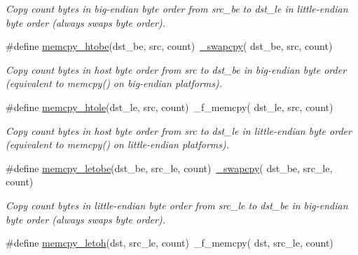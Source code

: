 \begin{DoxyCompactItemize}
\begin{DoxyCompactList}\small\item\em Copy {\itshape count} bytes in big-\/endian byte order from {\itshape src\-\_\-be} to {\itshape dst\-\_\-le} in little-\/endian byte order (always swaps byte order). \end{DoxyCompactList}\item 
\hypertarget{group__util__byteorder_gaf0f22982f04251ea70fba1fb30d55ef5}{\#define \hyperlink{group__util__byteorder_gaf0f22982f04251ea70fba1fb30d55ef5}{memcpy\-\_\-htobe}(dst\-\_\-be, src, count)~\hyperlink{group__util__byteorder_ga23fd4d4005a80a26ff3c6ba23a4af560}{\-\_\-swapcpy}( dst\-\_\-be, src, count)}\label{group__util__byteorder_gaf0f22982f04251ea70fba1fb30d55ef5}

\begin{DoxyCompactList}\small\item\em Copy {\itshape count} bytes in host byte order from {\itshape src} to {\itshape dst\-\_\-be} in big-\/endian byte order (equivalent to memcpy() on big-\/endian platforms). \end{DoxyCompactList}\item 
\hypertarget{group__util__byteorder_gaf677c5c03da581dab8015e8350750c00}{\#define \hyperlink{group__util__byteorder_gaf677c5c03da581dab8015e8350750c00}{memcpy\-\_\-htole}(dst\-\_\-le, src, count)~\-\_\-f\-\_\-memcpy( dst\-\_\-le, src, count)}\label{group__util__byteorder_gaf677c5c03da581dab8015e8350750c00}

\begin{DoxyCompactList}\small\item\em Copy {\itshape count} bytes in host byte order from {\itshape src} to {\itshape dst\-\_\-le} in little-\/endian byte order (equivalent to memcpy() on little-\/endian platforms). \end{DoxyCompactList}\item 
\hypertarget{group__util__byteorder_gac8afbbc0aa0b7d35ebf38f54dbfbe6c2}{\#define \hyperlink{group__util__byteorder_gac8afbbc0aa0b7d35ebf38f54dbfbe6c2}{memcpy\-\_\-letobe}(dst\-\_\-be, src\-\_\-le, count)~\hyperlink{group__util__byteorder_ga23fd4d4005a80a26ff3c6ba23a4af560}{\-\_\-swapcpy}( dst\-\_\-be, src\-\_\-le, count)}\label{group__util__byteorder_gac8afbbc0aa0b7d35ebf38f54dbfbe6c2}

\begin{DoxyCompactList}\small\item\em Copy {\itshape count} bytes in little-\/endian byte order from {\itshape src\-\_\-le} to {\itshape dst\-\_\-be} in big-\/endian byte order (always swaps byte order). \end{DoxyCompactList}\item 
\hypertarget{group__util__byteorder_ga9639d55fe8e5b4daf83a76de40aa3e4e}{\#define \hyperlink{group__util__byteorder_ga9639d55fe8e5b4daf83a76de40aa3e4e}{memcpy\-\_\-letoh}(dst, src\-\_\-le, count)~\-\_\-f\-\_\-memcpy( dst, src\-\_\-le, count)}\label{group__util__byteorder_ga9639d55fe8e5b4daf83a76de40aa3e4e}


\end{DoxyCompactItemize}
